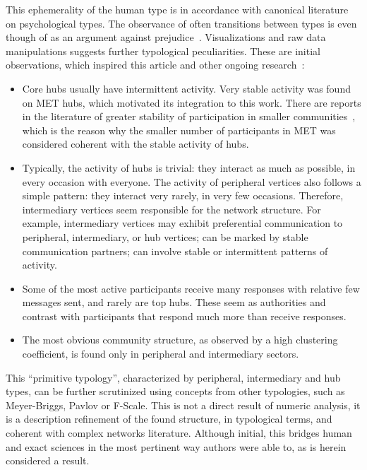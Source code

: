 \documentclass[%
 aip,
 jmp,%
 amsmath,amssymb,
 reprint,%
]{revtex4-1}
\begin{document}
This ephemerality of the human type is in accordance with canonical literature on psychological types. The observance of often transitions between types is even though of as an argument against prejudice~\cite{adorno}.
Visualizations and raw data manipulations suggests further typological peculiarities. These are initial observations, which inspired this article and other ongoing research~\cite{rcText,versinus}:

\begin{itemize}
    \item Core hubs usually have intermittent activity. Very stable activity was found on MET hubs, which motivated its integration to this work. There are reports in the literature of greater stability of participation in smaller communities~\cite{barabasiEvo}, which is the reason why the smaller number of participants in MET was considered coherent with the stable activity of hubs.
    \item Typically, the activity of hubs is trivial: they interact as much as possible, in every occasion with everyone. The activity of peripheral vertices also follows a simple pattern: they interact very rarely, in very few occasions. Therefore, intermediary vertices seem responsible for the network structure. For example, intermediary vertices may exhibit preferential communication to peripheral, intermediary, or hub vertices; can be marked by stable communication partners; can involve stable or intermittent patterns of activity.
    \item Some of the most active participants receive many responses with relative few messages sent, and rarely are top hubs. These seem as authorities and contrast with participants that respond much more than receive responses.
    \item The most obvious community structure, as observed by a high clustering coefficient, is found only in peripheral and intermediary sectors.
\end{itemize}

This ``primitive typology'', characterized by peripheral, intermediary and hub types, can be further scrutinized using concepts from other typologies, such as Meyer-Briggs, Pavlov or F-Scale. This is not a direct result of numeric analysis, it is a description refinement of the found structure, in typological terms, and coherent with complex networks literature. Although initial, this bridges human and exact sciences in the most pertinent way authors were able to, as is herein considered a result.
\end{document}
